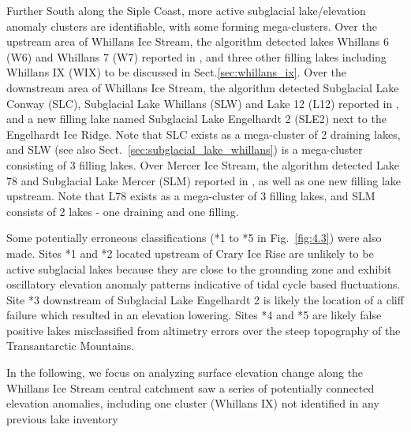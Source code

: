 Further South along the Siple Coast, more active subglacial lake/elevation anomaly clusters are identifiable, with some forming mega-clusters.
Over the upstream area of Whillans Ice Stream, the algorithm detected lakes Whillans 6 (W6) and Whillans 7 (W7) reported in \citet{Smithinventoryactivesubglacial2009}, and three other filling lakes including Whillans IX (WIX) to be discussed in Sect.\ref{sec:whillans_ix}.
Over the downstream area of Whillans Ice Stream, the algorithm detected Subglacial Lake Conway (SLC), Subglacial Lake Whillans (SLW) and Lake 12 (L12) reported in \citet{FrickerConnectedsubglaciallake2009}, and a new filling lake named Subglacial Lake Engelhardt 2 (SLE2) next to the Engelhardt Ice Ridge.
Note that SLC exists as a mega-cluster of 2 draining lakes, and SLW (see also Sect.~\ref{sec:subglacial_lake_whillans}) is a mega-cluster consisting of 3 filling lakes.
Over Mercer Ice Stream, the algorithm detected Lake 78 \citep[L78; see also][]{SiegfriedThirteenyearssubglacial2018} and Subglacial Lake Mercer (SLM) reported in \citet{FrickerConnectedsubglaciallake2009}, as well as one new filling lake upstream.
Note that L78 exists as a mega-cluster of 3 filling lakes, and SLM consists of 2 lakes - one draining and one filling.

Some potentially erroneous classifications (*1 to *5 in Fig.~\ref{fig:4.3}) were also made.
Sites *1 and *2 located upstream of Crary Ice Rise are unlikely to be active subglacial lakes because they are close to the grounding zone and exhibit oscillatory elevation anomaly patterns indicative of tidal cycle based fluctuations.
Site *3 downstream of Subglacial Lake Engelhardt 2 is likely the location of a cliff failure which resulted in an elevation lowering.
Sites *4 and *5 are likely false positive lakes misclassified from altimetry errors over the steep topography of the Transantarctic Mountains.

In the following, we focus on analyzing surface elevation change along the Whillans Ice Stream central catchment saw a series of potentially connected elevation anomalies, including one cluster (Whillans IX) not identified in any previous lake inventory


